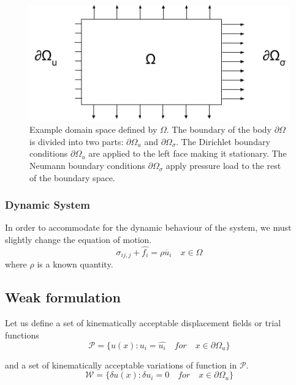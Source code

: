 \documentclass[en]{minipw} %
\begin{document}
\begin{figure}[h!]
\centering
\includegraphics[scale=0.5]{pictures/omega.png}
\caption[Example domain]{Example domain space defined by $\Omega$. The boundary of the body $\partial \Omega$ is divided into two parts: $\partial \Omega_{u}$ and $\partial \Omega_{\sigma}$. The Dirichlet boundary conditions $\partial \Omega_{u}$ are applied to the left face making it stationary. The Neumann boundary conditions $\partial \Omega_{\sigma}$ apply pressure load to the rest of the boundary space.}
\label{fig:omega}
\end{figure}


\subsubsection{Dynamic System}
In order to accommodate for the dynamic behaviour of the system, we must slightly change the equation of motion.
\begin{equation}
\label{eq:motion_dynamic}
\sigma_{ij,j} + \hat{f_{i}} = \rho \ddot{u_i} \quad x \in \Omega
\end{equation}
where $\rho$ is a known quantity.

\subsection{Weak formulation}
Let us define a set of kinematically acceptable displacement fields or trial functions
\begin{equation}
\mathcal{P} = \{ u(x) : u_i = \hat{u_i} \quad for \quad x \in \partial \Omega_{u} \}
\end{equation}

and a set of kinematically acceptable variations of function in $\mathcal{P}$.
\begin{equation}
\label{eq:variations}
\mathcal{W} = \{ \delta u(x) : \delta u_i = 0 \quad for \quad x \in \partial \Omega_{u} \}
\end{equation}
\end{document}
